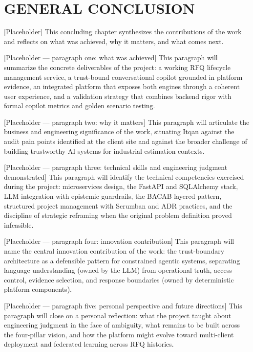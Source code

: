 \chapter*{GENERAL CONCLUSION}
\adjustmtc
\thispagestyle{MyStyle}

[Placeholder] This concluding chapter synthesizes the contributions of the work and reflects on what was achieved, why it matters, and what comes next.

[Placeholder — paragraph one: what was achieved] This paragraph will summarize the concrete deliverables of the project: a working RFQ lifecycle management service, a trust-bound conversational copilot grounded in platform evidence, an integrated platform that exposes both engines through a coherent user experience, and a validation strategy that combines backend rigor with formal copilot metrics and golden scenario testing.

[Placeholder — paragraph two: why it matters] This paragraph will articulate the business and engineering significance of the work, situating Itqan against the audit pain points identified at the client site and against the broader challenge of building trustworthy AI systems for industrial estimation contexts.

[Placeholder — paragraph three: technical skills and engineering judgment demonstrated] This paragraph will identify the technical competencies exercised during the project: microservices design, the FastAPI and SQLAlchemy stack, LLM integration with epistemic guardrails, the BACAB layered pattern, structured project management with Scrumban and ADR practices, and the discipline of strategic reframing when the original problem definition proved infeasible.

[Placeholder — paragraph four: innovation contribution] This paragraph will name the central innovation contribution of the work: the trust-boundary architecture as a defensible pattern for constrained agentic systems, separating language understanding (owned by the LLM) from operational truth, access control, evidence selection, and response boundaries (owned by deterministic platform components).

[Placeholder — paragraph five: personal perspective and future directions] This paragraph will close on a personal reflection: what the project taught about engineering judgment in the face of ambiguity, what remains to be built across the four-pillar vision, and how the platform might evolve toward multi-client deployment and federated learning across RFQ histories.